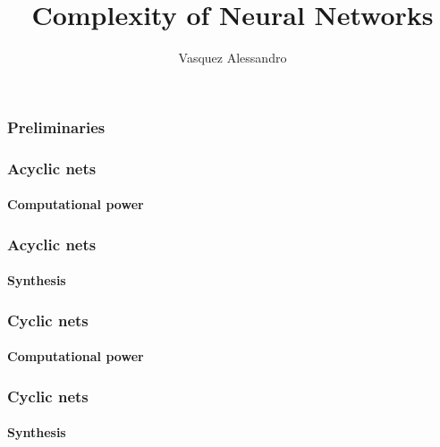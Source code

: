 \documentclass{beamer}
\title{Complexity of Neural Networks}
\author{Vasquez Alessandro}
\institute{Université Nice-Sophia-Antipolis}
\begin{document}
\frame{\titlepage}

\begin{frame}
\frametitle{Preliminaries}
\end{frame}

\begin{frame}
\frametitle{Acyclic nets}
\framesubtitle{Computational power}
\end{frame}

\begin{frame}
\frametitle{Acyclic nets}
\framesubtitle{Synthesis}
\end{frame}

\begin{frame}
\frametitle{Cyclic nets}
\framesubtitle{Computational power}
\end{frame}

\begin{frame}
\frametitle{Cyclic nets}
\framesubtitle{Synthesis}
\end{frame}
\end{document}
